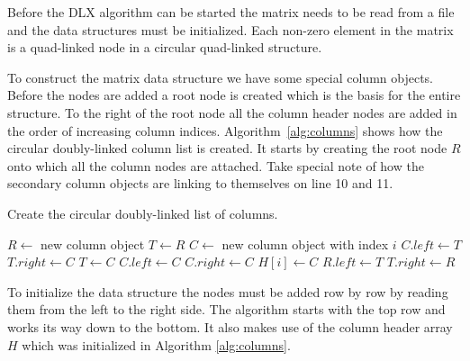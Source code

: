 Before the DLX algorithm can be started the matrix needs to be read from a file and the data structures must be initialized.
Each non-zero element in the matrix is a quad-linked node in a circular quad-linked structure.

To construct the matrix data structure we have some special column objects.
Before the nodes are added a root node is created which is the basis for the entire structure.
To the right of the root node all the column header nodes are added in the order of increasing column indices.
Algorithm~\ref{alg:columns} shows how the circular doubly-linked column list is created.
It starts by creating the root node $R$ onto which all the column nodes are attached.
Take special note of how the secondary column objects are linking to themselves on line 10 and 11.
\begin{algorithm}[htbp]
	\caption{Create the circular doubly-linked list of columns.}
	\label{alg:columns}
	\begin{distribalgo}[1]
		\STATE $R \leftarrow$ new column object
		\STATE $T \leftarrow R$
			\STATE $C \leftarrow$ new column object with index $i$
				\STATE $C.left \leftarrow T$  
				\STATE $T.right \leftarrow C$
				\STATE $T \leftarrow C$
			\ELSE
				\STATE $C.left \leftarrow C$  
				\STATE $C.right \leftarrow C$
			\ENDIF
			\STATE $H[i] \leftarrow C$
		\ENDFOR
		\STATE $R.left \leftarrow T$
		\STATE $T.right \leftarrow R$
	\end{distribalgo}
\end{algorithm}

To initialize the data structure the nodes must be added row by row by reading them from the left to the right side.
The algorithm starts with the top row and works its way down to the bottom.
It also makes use of the column header array $H$ which was initialized in Algorithm \ref{alg:columns}.

